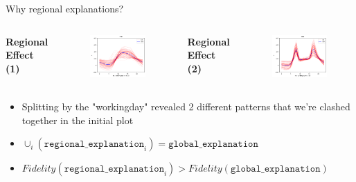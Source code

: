\documentclass[11pt,compress,t,notes=noshow, aspectratio=169, xcolor=table,dvipsnames]{beamer}
\begin{document}
\begin{frame}{Why regional explanations?}
\begin{columns}
      \hspace{2.5cm} %
      \centering
      \textbf{Regional Effect (1)}
        \begin{figure}
          \centering
          \includegraphics[width=.9\linewidth]{figure/01_bike_sharing_dataset_28_0.png}
      \end{figure}

     \centering
      \textbf{Regional Effect (2)}
        \begin{figure}
          \centering
          \includegraphics[width=.9\linewidth]{figure/01_bike_sharing_dataset_28_1.png}
      \end{figure}     
  \end{columns}
      \begin{itemize}
      \item Splitting by the "workingday" revealed 2 different patterns that we're clashed together in the initial plot
      \item $\cup_i (\texttt{regional\_explanation}_i) = \texttt{global\_explanation} $
      \item $Fidelity (\texttt{regional\_explanation}_i ) > Fidelity(\texttt{global\_explanation} ) $
      \end{itemize}
      
\end{frame}
\end{document}
